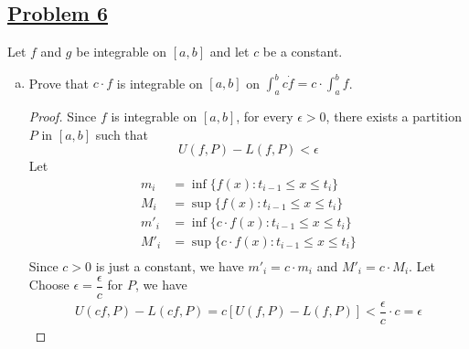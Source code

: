 \documentclass[10pt,letterpaper]{article}
\begin{document}
	\subsection*{{\color{purple}\underline{Problem 6}}}
	Let $f$ and $g$ be integrable on $[a, b]$ and let $c$ be a constant.
	\begin{enumerate}[(a)]
		\item Prove that $c \cdot f$ is integrable on $[a, b]$ on 
		$\displaystyle\int_{a}^{b} c \dot f = c \cdot \displaystyle\int_{a}^{b} f$.
		\begin{proof}
		Since $f$ is integrable on $[a, b]$, for every $\epsilon > 0$, there exists
		a partition $P$ in $[a, b]$ such that
		$$U(f, P) - L(f, P) < \epsilon$$
		Let 
		\begin{align*}
 			m_i  &= \inf\{f(x) : t_{i-1} \leq x \leq t_i\} \\
			M_i  &= \sup\{f(x) : t_{i-1} \leq x \leq t_i\} \\
			m'_i &= \inf\{c \cdot f(x) : t_{i-1} \leq x \leq t_i\} \\
			M'_i &= \sup\{c \cdot f(x) : t_{i-1} \leq x \leq t_i\} \\
		\end{align*}
		Since $c > 0$ is just a constant, we have $m'_i = c \cdot m_i$ and $M'_i = c \cdot M_i$. Let
		Choose $\epsilon = \dfrac{\epsilon}{c}$ for $P$, we have
	\begin{align*}
		U(cf, P) - L(cf, P) = c[U(f, P) - L(f, P)] < \dfrac{\epsilon}{c} \cdot c = \epsilon
	\end{align*}
		
		\end{proof}
		

\end{enumerate}
\end{document}
